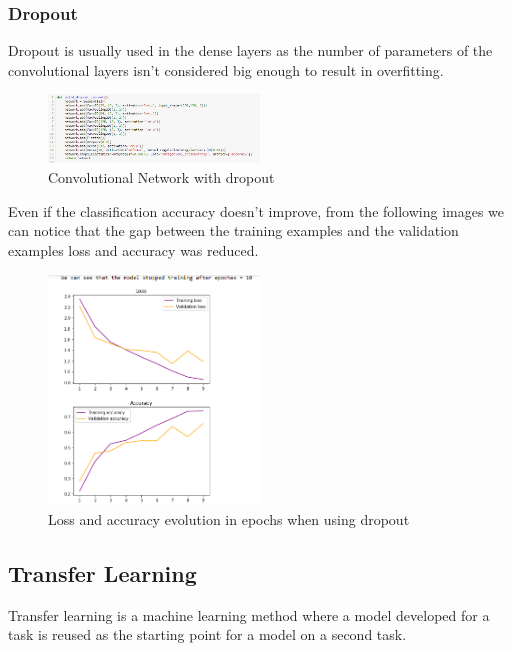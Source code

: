 \documentclass[a4paper,10pt]{article}
\begin{document}
   \subsubsection{Dropout}
   \quad Dropout is usually used in the dense layers as the number of parameters of the convolutional layers isn't considered big enough to result in overfitting. 
   
     \begin{figure}[!htbp]
   	\centering
   	\includegraphics[width=0.5\textwidth]{dropout.png}
   	\caption{Convolutional Network with dropout}
   \end{figure}
   \vspace{5mm} %
   
   \quad Even if the classification accuracy doesn't improve, from the following images we can notice that the gap between the training examples and the validation examples loss and accuracy was reduced.
     
     \begin{figure}[!htbp]
   	\centering
   	\includegraphics[width=0.5\textwidth]{lossaccdropout.png}
   	\caption{Loss and accuracy evolution in epochs when using dropout}
   \end{figure}
   \vspace{5mm} %
   
   
   \subsection{Transfer Learning}
   \quad \quad Transfer learning is a machine learning method where a model developed for a task is reused as the starting point for a model on a second task.
   
\end{document}
